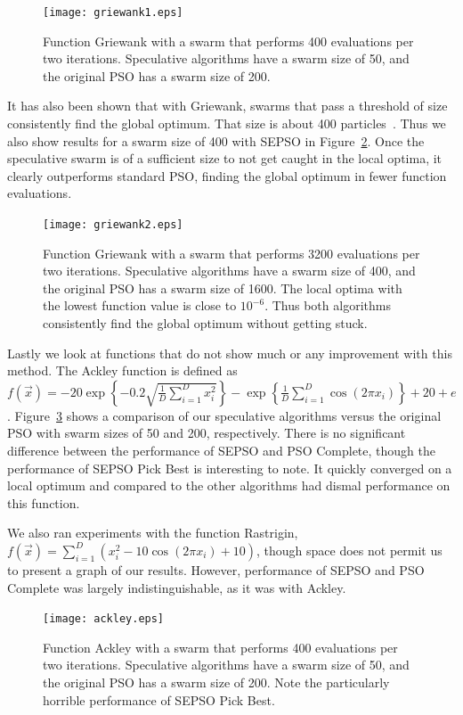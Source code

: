 \documentclass[conference,letterpaper]{IEEEtran}
\newcommand{\fig}[1]{Figure~\ref{fig:#1}}
\begin{document}
\begin{figure}
  \texttt{[image: griewank1.eps]}
  \caption{Function Griewank with a swarm that performs 400 evaluations per two
  iterations.  Speculative algorithms have a swarm size of 50, and the original
  PSO has a swarm size of 200.}
  \label{fig:griewank1}
\end{figure}

It has also been shown that with Griewank, swarms that pass a threshold of size
consistently find the global optimum.  That size is about 400
particles~\cite{mcnabb-cec09}.  Thus we also show results for a swarm size of
400 with SEPSO in \fig{griewank2}.  Once the speculative swarm is of a
sufficient size to not get caught in the local optima, it clearly outperforms
standard PSO, finding the global optimum in fewer function evaluations.

\begin{figure}
  \texttt{[image: griewank2.eps]}
  \caption{Function Griewank with a swarm that performs 3200 evaluations per
  two iterations.  Speculative algorithms have a swarm size of 400, and the
  original PSO has a swarm size of 1600.  The local optima with the lowest
  function value is close to $10^{-6}$.  Thus both algorithms consistently find
  the global optimum without getting stuck.}
  \label{fig:griewank2}
\end{figure}

Lastly we look at functions that do not show much or any improvement with this
method.  The Ackley function is defined as $f(\Vec{x}) = -20\exp\left\{
-0.2\sqrt{\frac{1}{D}\sum_{i=1}^Dx_i^2}\right\} - \exp\left\{\frac{1}{D}
\sum_{i=1}^D\cos(2\pi x_i)\right\}+20+e$. \fig{ackley} shows a comparison of
our speculative algorithms versus the original PSO with swarm sizes of 50 and
200, respectively.  There is no significant difference between the performance
of SEPSO and PSO Complete, though the performance of SEPSO Pick Best is
interesting to note.  It quickly converged on a local optimum and compared to
the other algorithms had dismal performance on this function.

We also ran experiments with the function Rastrigin, $f(\Vec{x}) = \sum_{i=1}^D
\left(x_i^2 - 10\cos\left(2\pi x_i\right) + 10\right)$,  though space does not
permit us to present a graph of our results.  However, performance of SEPSO and
PSO Complete was largely indistinguishable, as it was with Ackley.

\begin{figure}
  \texttt{[image: ackley.eps]}
  \caption{Function Ackley with a swarm that performs 400 evaluations per
  two iterations.  Speculative algorithms have a swarm size of 50, and the
  original PSO has a swarm size of 200.  Note the particularly horrible
  performance of SEPSO Pick Best.}
  \label{fig:ackley}
\end{figure}
\end{document}
